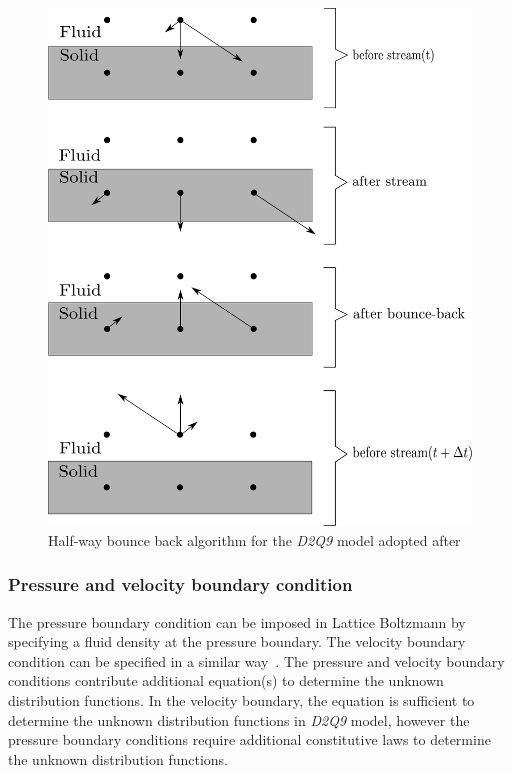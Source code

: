 \begin{figure}[htbp]
\centering
\includegraphics[scale=0.6]{Chapter3/figures/lbm/bounce.pdf}
\caption[Half-way bounce back algorithm for the \textit{D2Q9} model ]{Half-way bounce back algorithm for the \textit{D2Q9} model adopted after \citet{sukop2006}}
\label{fig:bounce}
\end{figure}

\subsubsection*{Pressure and velocity boundary condition}
The pressure boundary condition can be imposed in Lattice Boltzmann by specifying a fluid density at the pressure boundary. The velocity boundary condition can be specified in a similar way~\citep{zou1997}. The pressure and velocity boundary conditions contribute additional equation(s) to determine the unknown distribution functions. In the velocity boundary, the equation is sufficient to determine the unknown distribution functions in \textit{D2Q9} model, however the pressure boundary conditions require additional constitutive laws to determine the unknown distribution functions. 

